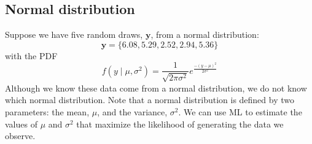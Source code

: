 \documentclass[11pt,letterpaper]{article}
\begin{document}
\subsection{Normal distribution}

Suppose we have five random draws, $\bm{y}$, from a normal distribution:
$$\bm{y} = \{ 6.08, 5.29, 2.52, 2.94, 5.36 \}$$
with the PDF
$$f(y \mid \mu, \sigma^2) = \frac{1}{\sqrt{2 \pi \sigma^2}} e^{\frac{-(y - \mu)^2}{2 \sigma^2}}$$
Although we know these data come from a normal distribution, we do not know which normal distribution. Note that a normal distribution is defined by two parameters: the mean, $\mu$, and the variance, $\sigma^2$. We can use ML to estimate the values of $\mu$ and $\sigma^2$ that maximize the likelihood of generating the data we observe. \\
\end{document}
